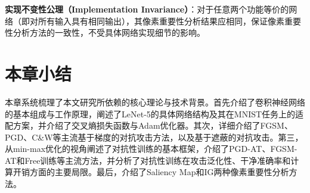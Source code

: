 \textbf{实现不变性公理（Implementation Invariance）}：对于任意两个功能等价的网络（即对所有输入具有相同输出），其像素重要性分析结果应相同，保证像素重要性分析方法的一致性，不受具体网络实现细节的影响。


\section{本章小结}

本章系统梳理了本文研究所依赖的核心理论与技术背景。首先介绍了卷积神经网络的基本组成与工作原理，阐述了LeNet-5的具体网络结构及其在MNIST任务上的适配方案，并介绍了交叉熵损失函数与Adam优化器。其次，详细介绍了FGSM、PGD、C\&W等主流基于梯度的对抗攻击方法，以及基于遮蔽的对抗攻击。第三，从min-max优化的视角阐述了对抗性训练的基本框架，介绍了PGD-AT、FGSM-AT和Free训练等主流方法，并分析了对抗性训练在攻击泛化性、干净准确率和计算开销方面的主要局限。最后，介绍了Saliency Map和IG两种像素重要性分析方法。
